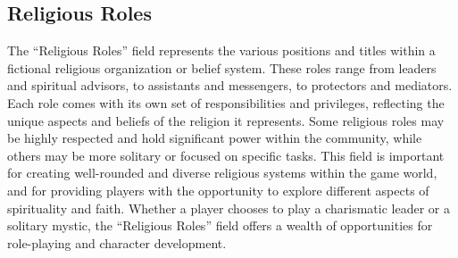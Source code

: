\hypertarget{religious-roles}{%
\subsection{Religious Roles}\label{religious-roles}}

The ``Religious Roles'' field represents the various positions and
titles within a fictional religious organization or belief system. These
roles range from leaders and spiritual advisors, to assistants and
messengers, to protectors and mediators. Each role comes with its own
set of responsibilities and privileges, reflecting the unique aspects
and beliefs of the religion it represents. Some religious roles may be
highly respected and hold significant power within the community, while
others may be more solitary or focused on specific tasks. This field is
important for creating well-rounded and diverse religious systems within
the game world, and for providing players with the opportunity to
explore different aspects of spirituality and faith. Whether a player
chooses to play a charismatic leader or a solitary mystic, the
``Religious Roles'' field offers a wealth of opportunities for
role-playing and character development.

